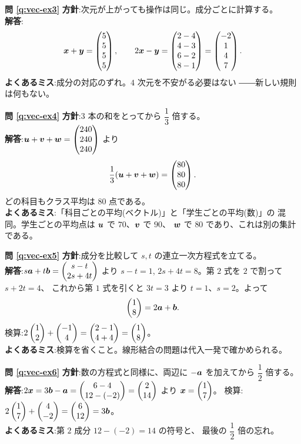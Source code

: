 \bigskip
\noindent\textbf{問 \ref{q:vec-ex3}}\quad
\textbf{方針}:次元が上がっても操作は同じ。成分ごとに計算する。\\
\textbf{解答}:
\[
\bm{x} + \bm{y} = \begin{pmatrix}5 \\ 5 \\ 5 \\ 5\end{pmatrix},
\qquad
2\bm{x} - \bm{y} = \begin{pmatrix}2 - 4 \\ 4 - 3 \\ 6 - 2 \\ 8 - 1\end{pmatrix}
= \begin{pmatrix}-2 \\ 1 \\ 4 \\ 7\end{pmatrix}.
\]
\textbf{よくあるミス}:成分の対応のずれ。$4$ 次元を不安がる必要はない
――新しい規則は何もない。

\bigskip
\noindent\textbf{問 \ref{q:vec-ex4}}\quad
\textbf{方針}:$3$ 本の和をとってから $\dfrac{1}{3}$ 倍する。\\
\textbf{解答}:$\bm{u} + \bm{v} + \bm{w} = \begin{pmatrix}240 \\ 240 \\ 240\end{pmatrix}$ より
\[
\frac{1}{3}(\bm{u} + \bm{v} + \bm{w}) = \begin{pmatrix}80 \\ 80 \\ 80\end{pmatrix}.
\]
どの科目もクラス平均は $80$ 点である。\\
\textbf{よくあるミス}:「科目ごとの平均(ベクトル)」と「学生ごとの平均(数)」の
混同。学生ごとの平均点は $\bm{u}$ で $70$、$\bm{v}$ で $90$、
$\bm{w}$ で $80$ であり、これは別の集計である。

\bigskip
\noindent\textbf{問 \ref{q:vec-ex5}}\quad
\textbf{方針}:成分を比較して $s, t$ の連立一次方程式を立てる。\\
\textbf{解答}:$s\bm{a} + t\bm{b} = \begin{pmatrix}s - t \\ 2s + 4t\end{pmatrix}$ より
$s - t = 1$, $2s + 4t = 8$。第 $2$ 式を $2$ で割って $s + 2t = 4$、
これから第 $1$ 式を引くと $3t = 3$ より $t = 1$、$s = 2$。よって
\[
\begin{pmatrix}1 \\ 8\end{pmatrix} = 2\bm{a} + \bm{b}.
\]
検算:$2\begin{pmatrix}1 \\ 2\end{pmatrix} + \begin{pmatrix}-1 \\ 4\end{pmatrix} = \begin{pmatrix}2 - 1 \\ 4 + 4\end{pmatrix} = \begin{pmatrix}1 \\ 8\end{pmatrix}$。\\
\textbf{よくあるミス}:検算を省くこと。線形結合の問題は代入一発で確かめられる。

\bigskip
\noindent\textbf{問 \ref{q:vec-ex6}}\quad
\textbf{方針}:数の方程式と同様に、両辺に $-\bm{a}$ を加えてから
$\dfrac{1}{2}$ 倍する。\\
\textbf{解答}:$2\bm{x} = 3\bm{b} - \bm{a}
= \begin{pmatrix}6 - 4 \\ 12 - (-2)\end{pmatrix} = \begin{pmatrix}2 \\ 14\end{pmatrix}$ より
$\bm{x} = \begin{pmatrix}1 \\ 7\end{pmatrix}$。
検算:$2\begin{pmatrix}1 \\ 7\end{pmatrix} + \begin{pmatrix}4 \\ -2\end{pmatrix} = \begin{pmatrix}6 \\ 12\end{pmatrix} = 3\bm{b}$。\\
\textbf{よくあるミス}:第 $2$ 成分 $12 - (-2) = 14$ の符号と、
最後の $\dfrac{1}{2}$ 倍の忘れ。

